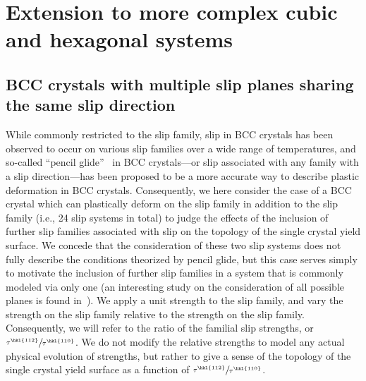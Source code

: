 \documentclass[preprint,3p,times,sort&compress,letterpaper,12pt]{elsarticle} %
\begin{document}
\section{Extension to more complex cubic and hexagonal systems}
\label{sec:novel_predictions}

\subsection{BCC crystals with multiple slip planes sharing the same slip direction}
\label{subsubsec:bcc_with_multiple}

While commonly restricted to the  slip family, slip in BCC crystals has been observed to occur on various slip families over a wide range of temperatures, and so-called ``pencil glide''~\cite{Piehler1971} in BCC crystals---or slip associated with any family with a  slip direction---has been proposed to be a more accurate way to describe plastic deformation in BCC crystals. Consequently, we here consider the case of a BCC crystal which can plastically deform on the  slip family in addition to the  slip family (i.e., 24 slip systems in total) to judge the effects of the inclusion of further slip families associated with  slip on the topology of the single crystal yield surface. We concede that the consideration of these two slip systems does not fully describe the conditions theorized by pencil glide, but this case serves simply to motivate the inclusion of further slip families in a system that is commonly modeled via only one (an interesting study on the consideration of all possible planes is found in~\cite{Piehler1971}). We apply a unit strength to the  slip family, and vary the strength on the  slip family relative to the strength on the  slip family. Consequently, we will refer to the ratio of the familial slip strengths, or $\sfrac{\tau^{\hkl{1 1 2}}}{\tau^{\hkl{1 1 0}}}$. We do not modify the relative strengths to model any actual physical evolution of strengths, but rather to give a sense of the topology of the single crystal yield surface as a function of $\sfrac{\tau^{\hkl{1 1 2}}}{\tau^{\hkl{1 1 0}}}$.
\end{document}
